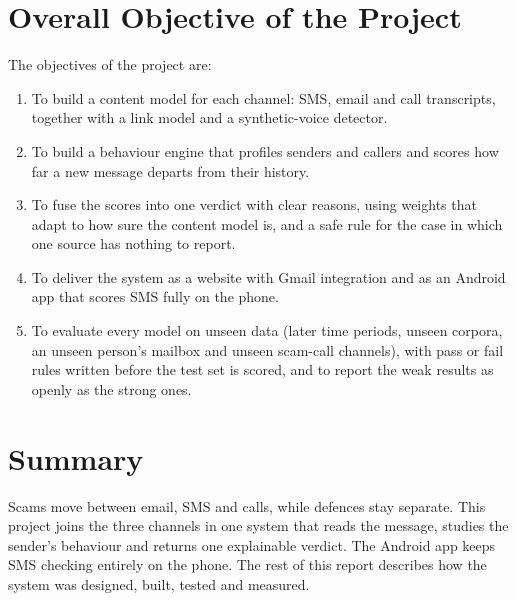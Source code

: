 {\section{Overall Objective of the Project}
The objectives of the project are:
\begin{enumerate}
\item To build a content model for each channel: SMS, email and call transcripts, together with a link model and a synthetic-voice detector.
\item To build a behaviour engine that profiles senders and callers and scores how far a new message departs from their history.
\item To fuse the scores into one verdict with clear reasons, using weights that adapt to how sure the content model is, and a safe rule for the case in which one source has nothing to report.
\item To deliver the system as a website with Gmail integration and as an Android app that scores SMS fully on the phone.
\item To evaluate every model on unseen data (later time periods, unseen corpora, an unseen person's mailbox and unseen scam-call channels), with pass or fail rules written before the test set is scored, and to report the weak results as openly as the strong ones.
\end{enumerate}

\section{Summary}
Scams move between email, SMS and calls, while defences stay separate. This project joins the three channels in one system that reads the message, studies the sender's behaviour and returns one explainable verdict. The Android app keeps SMS checking entirely on the phone. The rest of this report describes how the system was designed, built, tested and measured.

}
